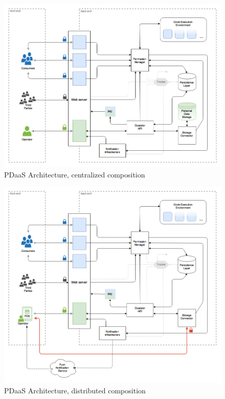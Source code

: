 \documentclass[12pt,english,a4paper,titlepage,cleardoublepage=empty,dottedtoc]{report}
\begin{document}
\begin{figure}
\centering
\includegraphics{./assets/figures/pdaas_component-composition_centralized.png}
\caption{PDaaS Architecture, centralized
composition\label{fig:composition-centralized}}
\end{figure}

\begin{figure}
\centering
\includegraphics{./assets/figures/pdaas_component-composition_distributed.png}
\caption{PDaaS Architecture, distributed
composition\label{fig:composition-distributed}}
\end{figure}
\end{document}
